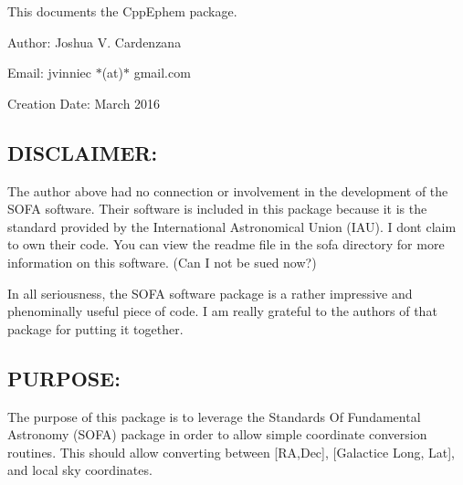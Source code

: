 This documents the Cpp\+Ephem package.


\begin{DoxyItemize}
\item Author\+: Joshua V. Cardenzana
\item Email\+: jvinniec $\ast$(at)$\ast$ gmail.\+com
\item Creation Date\+: March 2016
\end{DoxyItemize}

\subsection*{D\+I\+S\+C\+L\+A\+I\+M\+E\+R\+: }

The author above had no connection or involvement in the development of the S\+O\+F\+A software. Their software is included in this package because it is the standard provided by the International Astronomical Union (I\+A\+U). I dont claim to own their code. You can view the readme file in the sofa directory for more information on this software. (Can I not be sued now?)

In all seriousness, the S\+O\+F\+A software package is a rather impressive and phenominally useful piece of code. I am really grateful to the authors of that package for putting it together.

\subsection*{P\+U\+R\+P\+O\+S\+E\+: }

The purpose of this package is to leverage the Standards Of Fundamental Astronomy (S\+O\+F\+A) package in order to allow simple coordinate conversion routines. This should allow converting between \mbox{[}R\+A,Dec\mbox{]}, \mbox{[}Galactice Long, Lat\mbox{]}, and local sky coordinates.

